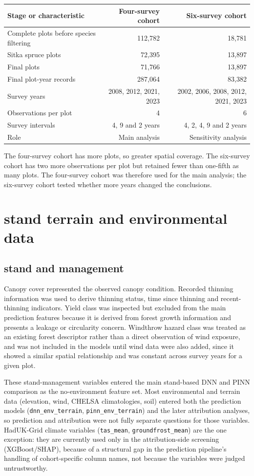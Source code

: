 \documentclass[11pt,a4paper]{report}
\begin{document}
\begin{table}[h]
\centering
\begin{tabular}{lrr}
\hline
Stage or characteristic & Four-survey cohort & Six-survey cohort \\
\hline
Complete plots before species filtering & 112,782 & 18,781 \\
Sitka spruce plots & 72,395 & 13,897 \\
Final plots & 71,766 & 13,897 \\
Final plot-year records & 287,064 & 83,382 \\
Survey years & 2008, 2012, 2021, 2023 & 2002, 2006, 2008, 2012, 2021, 2023 \\
Observations per plot & 4 & 6 \\
Survey intervals & 4, 9 and 2 years & 4, 2, 4, 9 and 2 years \\
Role & Main analysis & Sensitivity analysis \\
\hline
\end{tabular}
\end{table}

The four-survey cohort has more plots, so greater spatial coverage.
The six-survey cohort has two more observations per plot but retained fewer than one-fifth as many plots.
The four-survey cohort was therefore used for the main analysis; the six-survey cohort tested whether more years changed the conclusions.

\section{stand terrain and environmental data}
\subsection{stand and management}
Canopy cover represented the observed canopy condition.
Recorded thinning information was used to derive thinning status, time since thinning and recent-thinning indicators.
Yield class was inspected but excluded from the main prediction features because it is derived from forest growth information and presents a leakage or circularity concern.
Windthrow hazard class was treated as an existing forest descriptor rather than a direct observation of wind exposure, and was not included in the models until wind data were also added, since it showed a similar spatial relationship and was constant across survey years for a given plot.

These stand-management variables entered the main stand-based DNN and PINN comparison as the no-environment feature set.
Most environmental and terrain data (elevation, wind, CHELSA climatologies, soil) entered both the prediction models (\texttt{dnn\_env\_terrain}, \texttt{pinn\_env\_terrain}) and the later attribution analyses, so prediction and attribution were not fully separate questions for those variables.
HadUK-Grid climate variables (\texttt{tas\_mean}, \texttt{groundfrost\_mean}) are the one exception: they are currently used only in the attribution-side screening (XGBoost/SHAP), because of a structural gap in the prediction pipeline's handling of cohort-specific column names, not because the variables were judged untrustworthy.
\end{document}
